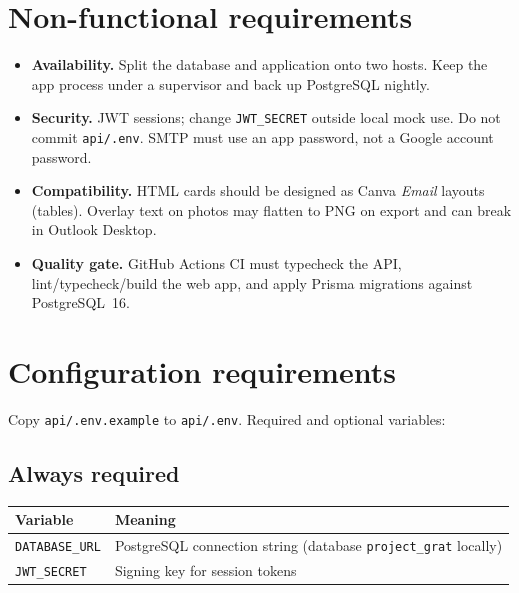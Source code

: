 \documentclass[11pt,a4paper]{article}
\begin{document}
\section{Non-functional requirements}
\begin{itemize}[leftmargin=1.4em]
  \item \textbf{Availability.} Split the database and application onto two hosts. Keep the app process under a supervisor and back up PostgreSQL nightly.
  \item \textbf{Security.} JWT sessions; change \texttt{JWT\_SECRET} outside local mock use. Do not commit \texttt{api/.env}. SMTP must use an app password, not a Google account password.
  \item \textbf{Compatibility.} HTML cards should be designed as Canva \emph{Email} layouts (tables). Overlay text on photos may flatten to PNG on export and can break in Outlook Desktop.
  \item \textbf{Quality gate.} GitHub Actions CI must typecheck the API, lint/typecheck/build the web app, and apply Prisma migrations against PostgreSQL~16.
\end{itemize}

\section{Configuration requirements}
Copy \texttt{api/.env.example} to \texttt{api/.env}. Required and optional variables:

\subsection{Always required}
\begin{tabularx}{\textwidth}{lX}
  \toprule
  \textbf{Variable} & \textbf{Meaning} \\
  \midrule
  \texttt{DATABASE\_URL} & PostgreSQL connection string (database \texttt{project\_grat} locally) \\
  \texttt{JWT\_SECRET} & Signing key for session tokens \\
  \bottomrule
\end{tabularx}
\end{document}
